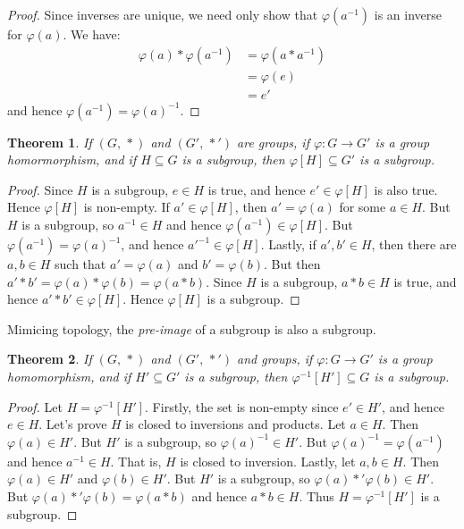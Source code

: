 \documentclass{article}
\theoremstyle{plain}
\newtheorem{theorem}{Theorem}[section]
\theoremstyle{normal}
\begin{document}
        \begin{proof}
            Since inverses are unique, we need only show that
            $\varphi(a^{-1})$ is an inverse for $\varphi(a)$. We have:
            \begin{align}
                \varphi(a)*\varphi(a^{-1})
                &=\varphi(a*a^{-1})\tag{Homomorphism}\\
                &=\varphi(e)\tag{Identity}\\
                &=e'\tag{Previous Theorem}
            \end{align}
            and hence $\varphi(a^{-1})=\varphi(a)^{-1}$.
        \end{proof}
        \begin{theorem}
            If $(G,\,*)$ and $(G',\,*')$ are groups, if
            $\varphi:G\rightarrow{G}'$ is a group homormorphism, and if
            $H\subseteq{G}$ is a subgroup, then
            $\varphi[H]\subseteq{G}'$ is a subgroup.
        \end{theorem}
        \begin{proof}
            Since $H$ is a subgroup, $e\in{H}$ is true, and hence
            $e'\in\varphi[H]$ is also true. Hence $\varphi[H]$ is non-empty.
            If $a'\in\varphi[H]$, then $a'=\varphi(a)$ for some $a\in{H}$.
            But $H$ is a subgroup, so $a^{-1}\in{H}$ and hence
            $\varphi(a^{-1})\in\varphi[H]$. But
            $\varphi(a^{-1})=\varphi(a)^{-1}$, and hence
            $a'^{-1}\in\varphi[H]$. Lastly, if $a',b'\in{H}$, then there are
            $a,b\in{H}$ such that $a'=\varphi(a)$ and $b'=\varphi(b)$. But
            then $a'*b'=\varphi(a)*\varphi(b)=\varphi(a*b)$. Since $H$ is a
            subgroup, $a*b\in{H}$ is true, and hence $a'*b'\in\varphi[H]$.
            Hence $\varphi[H]$ is a subgroup.
        \end{proof}
        Mimicing topology, the \textit{pre-image} of a subgroup is also a
        subgroup.
        \begin{theorem}
            If $(G,\,*)$ and $(G',\,*')$ and groups, if
            $\varphi:G\rightarrow{G}'$ is a group homomorphism,
            and if $H'\subseteq{G}'$ is a subgroup, then
            $\varphi^{-1}[H']\subseteq{G}$ is a subgroup.
        \end{theorem}
        \begin{proof}
            Let $H=\varphi^{-1}[H']$. Firstly, the set is non-empty since
            $e'\in{H}'$, and hence $e\in{H}$. Let's prove $H$ is closed to
            inversions and products. Let
            $a\in{H}$. Then $\varphi(a)\in{H}'$. But $H'$ is a subgroup,
            so $\varphi(a)^{-1}\in{H}'$. But $\varphi(a)^{-1}=\varphi(a^{-1})$
            and hence $a^{-1}\in{H}$. That is, $H$ is closed to inversion.
            Lastly, let $a,b\in{H}$. Then $\varphi(a)\in{H}'$ and
            $\varphi(b)\in{H}'$. But $H'$ is a subgroup, so
            $\varphi(a)*'\varphi(b)\in{H}'$. But
            $\varphi(a)*'\varphi(b)=\varphi(a*b)$ and hence
            $a*b\in{H}$. Thus $H=\varphi^{-1}[H']$ is a subgroup.
        \end{proof}
\end{document}
